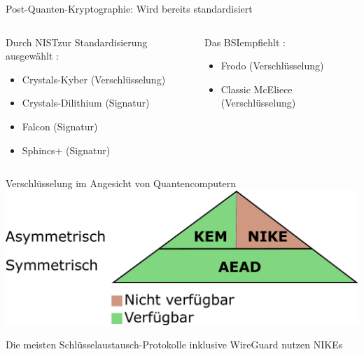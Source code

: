 \documentclass[german]{rosenpass-beamer}
\begin{document}
\begin{frame}{Post-Quanten-Kryptographie: Wird bereits standardisiert}

\begin{columns}[T]
\begin{column}{.50\textwidth}

\large Durch NIST\footnotemark zur Standardisierung ausgewählt \cite{nist-selected-algorithms}:
\normalsize


\vspace{2mm}

\begin{itemize}
    \item Crystals-Kyber (Verschlüsselung)
    \item Crystals-Dilithium (Signatur)
    \item Falcon (Signatur)
    \item Sphincs+ (Signatur)
\end{itemize}

\end{column}

\begin{column}{.50\textwidth}
\large Das BSI\footnotemark empfiehlt \cite{bsi-quantensicher-gestalten}\normalsize:

\vspace{2mm}

\begin{itemize}
    \item Frodo (Verschlüsselung)
    \item Classic McEliece (Verschlüsselung)
\end{itemize}

\end{column}
\end{columns}

\end{frame}

\begin{frame}[label=NIKE]{Verschlüsselung im Angesicht von Quantencomputern}
    \includegraphics[height=.6\textheight]{graphics/Primitivenpyramide.pdf}
      
    Die meisten Schlüsselaustausch-Protokolle inklusive WireGuard nutzen NIKEs    
\end{frame}
\end{document}
